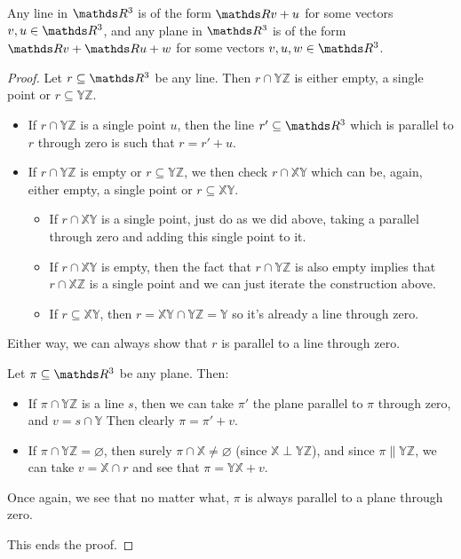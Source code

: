 \begin{prop}
Any line in $\R^3$ is of the form $\R v+u$ for some vectors $v,u\in \R^3$, and any plane in $\R^3$ is of the form $\R v+\R u+w$ for some vectors $v,u,w\in \R^3$.
\end{prop}
\begin{proof}
	Let $r\subseteq \R^3$ be any line. Then $r\cap \mathds{YZ}$ is either empty, a single point or $r\subseteq \mathds{YZ}$.
	
	\begin{itemize}
		\item If $r\cap\mathds{YZ}$ is a single point $u$, then the line $r'\subseteq\R^3$ which is parallel to $r$ through zero is such that $r=r'+u$.
		
		\item If $r\cap \mathds{YZ}$ is empty or $r\subseteq\mathds{YZ}$, we then check $r\cap \mathds{XY}$ which can be, again, either empty, a single point or $r\subseteq \mathds{XY}$.
		
		\begin{itemize}
			\item If $r\cap \mathds{XY}$ is a single point, just do as we did above, taking a parallel through zero and adding this single point to it.
			
			\item If $r\cap\mathds{XY}$ is empty, then the fact that $r\cap\mathds{YZ}$ is also empty implies that $r\cap\mathds{XZ}$ is a single point and we can just iterate the construction above.
			
			\item If $r\subseteq\mathds{XY}$, then $r=\mathds{XY}\cap\mathds{YZ}=\mathds{Y}$ so it's already a line through zero.
		\end{itemize}
	\end{itemize}

Either way, we can always show that $r$ is parallel to a line through zero.

\bigskip
Let $\pi\subseteq\R^3$ be any plane. Then:
\begin{itemize}
	\item If $\pi\cap\mathds{YZ}$ is a line $s$, then we can take $\pi'$ the plane parallel to $\pi$ through zero, and $v=s\cap \mathds{Y}$ Then clearly $\pi=\pi'+v$.
	
	\item If $\pi\cap\mathds{YZ}=\varnothing$, then surely $\pi\cap \mathds{X}\neq\varnothing$ (since $\mathds{X}\perp\mathds{YZ}$), and since $\pi\parallel\mathds{YZ}$, we can take $v=\mathds{X}\cap r$ and see that $\pi=\mathds{YX}+v$. 
\end{itemize}

Once again, we see that no matter what, $\pi$ is always parallel to a plane through zero.

This ends the proof.
\end{proof}

